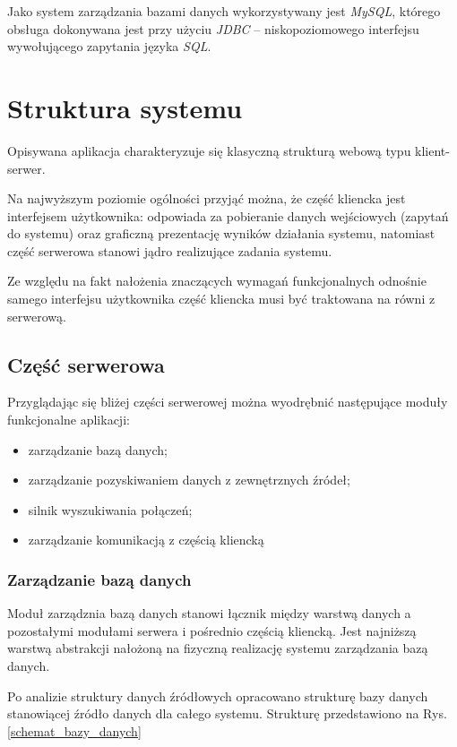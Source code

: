 \documentclass[a4paper,12pt]{article}
\begin{document}
Jako system zarządzania bazami danych wykorzystywany jest \emph{MySQL}, którego
obsługa dokonywana jest przy użyciu \emph{JDBC} -- niskopoziomowego interfejsu
wywołującego zapytania języka \emph{SQL}.

\section{Struktura systemu}

Opisywana aplikacja charakteryzuje się klasyczną strukturą webową typu
klient-serwer.

Na najwyższym poziomie ogólności przyjąć można, że część kliencka jest
interfejsem użytkownika: odpowiada za pobieranie danych wejściowych (zapytań do
systemu) oraz graficzną prezentację wyników działania systemu, natomiast część
serwerowa stanowi jądro realizujące zadania systemu.

Ze względu na fakt nałożenia znaczących wymagań funkcjonalnych odnośnie samego
interfejsu użytkownika część kliencka musi być traktowana na równi z serwerową.

\subsection{Część serwerowa}
Przyglądając się bliżej części serwerowej można wyodrębnić następujące moduły
funkcjonalne aplikacji:
\begin{itemize}
  \item zarządzanie bazą danych;
  \item zarządzanie pozyskiwaniem danych z zewnętrznych źródeł;
  \item silnik wyszukiwania połączeń;
  \item zarządzanie komunikacją z częścią kliencką
\end{itemize}
\subsubsection{Zarządzanie bazą danych}
Moduł zarządznia bazą danych stanowi łącznik między warstwą danych a
pozostałymi modułami serwera i pośrednio częścią kliencką. Jest najniższą
warstwą abstrakcji nałożoną na fizyczną realizację systemu zarządzania bazą
danych. 

Po analizie struktury danych źródłowych opracowano strukturę bazy danych
stanowiącej źródło danych dla całego systemu. Strukturę przedstawiono na Rys.
\ref{schemat_bazy_danych}
\end{document}
